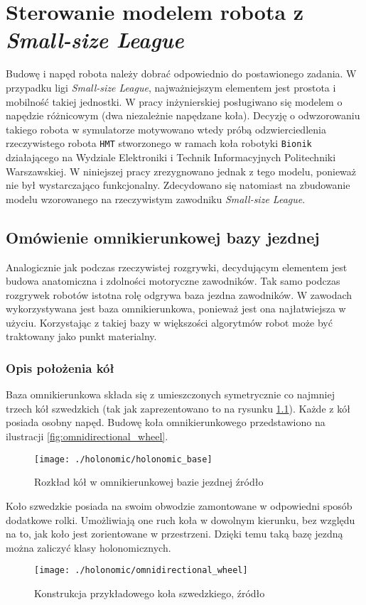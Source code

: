 \chapter[Sterowanie modelem robota z \emph{Small-size League}]{Sterowanie modelem robota z \emph{Small-size League} \label{chap:holonomic}}
Budowę i napęd robota należy dobrać odpowiednio do postawionego zadania. W przypadku ligi \emph{Small-size League}, najważniejszym elementem jest prostota i mobilność
takiej jednostki. W pracy inżynierskiej \cite{inzynierka} posługiwano się  modelem o napędzie różnicowym (dwa niezależnie napędzane koła). Decyzję o odwzorowaniu takiego robota
w symulatorze motywowano wtedy próbą odzwierciedlenia rzeczywistego robota \texttt{HMT} \cite{hamada_mgr} stworzonego w ramach koła robotyki \texttt{Bionik} działającego na Wydziale Elektroniki i Technik Informacyjnych Politechniki
Warszawskiej. W niniejszej pracy zrezygnowano jednak z tego modelu, ponieważ nie był wystarczająco funkcjonalny. Zdecydowano się natomiast na zbudowanie modelu wzorowanego na rzeczywistym zawodniku \emph{Small-size League}.  
\section{Omówienie omnikierunkowej bazy jezdnej}
Analogicznie jak podczas rzeczywistej rozgrywki, decydującym elementem jest budowa anatomiczna i zdolności motoryczne zawodników. Tak samo podczas
rozgrywek robotów istotna rolę odgrywa baza jezdna zawodników.  W zawodach wykorzystywana jest baza omnikierunkowa, ponieważ jest ona najłatwiejsza w użyciu. Korzystając z takiej bazy w
większości algorytmów robot może być traktowany jako punkt materialny.
\subsection{Opis położenia kół}
Baza omnikierunkowa składa się z umieszczonych symetrycznie co najmniej trzech kół szwedzkich (tak jak zaprezentowano to na rysunku \ref{fig:holonomic_base}).
Każde z kół posiada osobny napęd. Budowę koła omnikierunkowego przedstawiono na ilustracji \ref{fig:omnidirectional_wheel}. 
\begin{figure}[h!]
\centering
\texttt{[image: ./holonomic/holonomic\_base]}
\caption{ Rozkład kół w omnikierunkowej bazie jezdnej źródło \cite{omni_base_2}\label{fig:holonomic_base}}
\end{figure}
Koło szwedzkie posiada na swoim obwodzie zamontowane w odpowiedni sposób dodatkowe rolki. Umożliwiają one ruch koła w dowolnym kierunku, bez względu na to, 
jak koło jest zorientowane w przestrzeni. Dzięki temu taką bazę jezdną można zaliczyć klasy holonomicznych.
\begin{figure}[h]
\centering
\texttt{[image: ./holonomic/omnidirectional\_wheel]}
\caption{ Konstrukcja przykładowego koła szwedzkiego, źródło \cite{omni_base_1}\label{fig:swedish_wheel.png}}
\end{figure}
